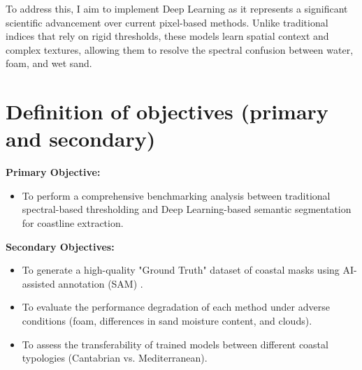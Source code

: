 \documentclass[ENG]{TFUOC}%
\begin{document}
To address this, I aim to implement Deep Learning as it represents a significant scientific advancement over current pixel-based methods. Unlike traditional indices that rely on rigid thresholds, these models learn spatial context and complex textures, allowing them to resolve the spectral confusion between water, foam, and wet sand.

\chapter{Definition of objectives (primary and secondary)}
\noindent\textbf{Primary Objective:}
\begin{itemize}
    \item To perform a comprehensive benchmarking analysis between traditional spectral-based thresholding and Deep Learning-based semantic segmentation for coastline extraction.
\end{itemize}

\noindent\textbf{Secondary Objectives:}
\begin{itemize}
    \item To generate a high-quality "Ground Truth" dataset of coastal masks using AI-assisted annotation (SAM) \cite{kirillov_segment_2023}.
    \item To evaluate the performance degradation of each method under adverse conditions (foam, differences in sand moisture content, and clouds).
    \item To assess the transferability of trained models between different coastal typologies (Cantabrian vs. Mediterranean).
\end{itemize}
\end{document}
